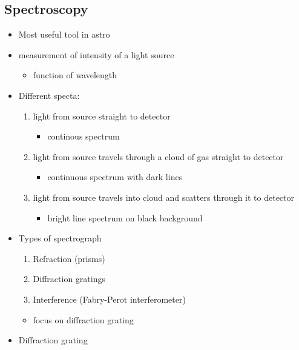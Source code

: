 \documentclass[a4paper,11pt,normalem]{article}
\begin{document}
\subsection{Spectroscopy}
\begin{itemize}
    \item Most useful tool in astro
    \item measurement of intensity of a light source
        \begin{itemize}
            \item function of wavelength
        \end{itemize}
    \item Different specta:
        \begin{enumerate}
            \item light from source straight to detector
                \begin{itemize}
                    \item continous spectrum
                \end{itemize}
            \item light from source travels through a cloud of gas straight to detector
                \begin{itemize}
                    \item continuous spectrum with dark lines
                \end{itemize}
            \item light from source travels into cloud and scatters through it to detector
                \begin{itemize}
                    \item bright line spectrum on black background
                \end{itemize}
        \end{enumerate}
    \item Types of spectrograph
        \begin{enumerate}
            \item Refraction (prisms)
            \item Diffraction gratings
            \item Interference (Fabry-Perot interferometer)
        \end{enumerate}
        \begin{itemize}
            \item focus on diffraction grating
        \end{itemize}
    \item Diffraction grating

\end{itemize}
\end{document}
